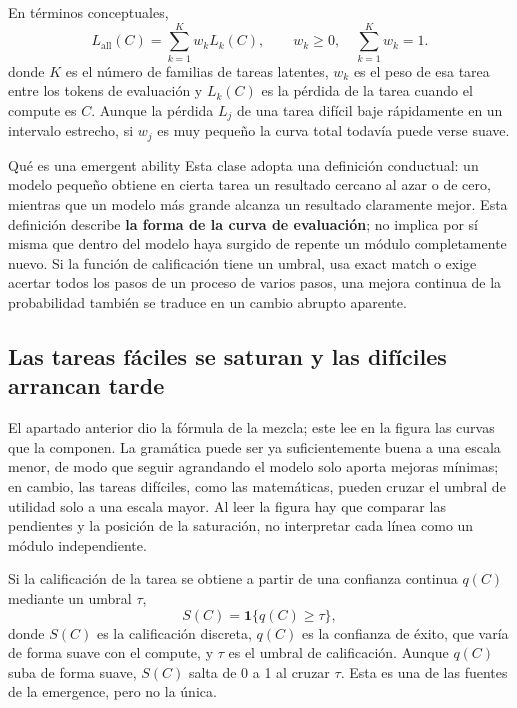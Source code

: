En términos conceptuales,
\[
L_{\mathrm{all}}(C)=\sum_{k=1}^{K} w_k L_k(C),
\qquad w_k\ge 0,\quad \sum_{k=1}^{K}w_k=1.
\]
donde $K$ es el número de familias de tareas latentes, $w_k$ es el peso de esa tarea entre los tokens de evaluación y $L_k(C)$ es la pérdida de la tarea cuando el compute es $C$. Aunque la pérdida $L_j$ de una tarea difícil baje rápidamente en un intervalo estrecho, si $w_j$ es muy pequeño la curva total todavía puede verse suave.

\begin{knowledgebox}{Qué es una emergent ability}
Esta clase adopta una definición conductual: un modelo pequeño obtiene en cierta tarea un resultado cercano al azar o de cero, mientras que un modelo más grande alcanza un resultado claramente mejor. Esta definición describe \textbf{la forma de la curva de evaluación}; no implica por sí misma que dentro del modelo haya surgido de repente un módulo completamente nuevo. Si la función de calificación tiene un umbral, usa exact match o exige acertar todos los pasos de un proceso de varios pasos, una mejora continua de la probabilidad también se traduce en un cambio abrupto aparente.
\end{knowledgebox}

\subsection{Las tareas fáciles se saturan y las difíciles arrancan tarde}

El apartado anterior dio la fórmula de la mezcla; este lee en la figura las curvas que la componen. La gramática puede ser ya suficientemente buena a una escala menor, de modo que seguir agrandando el modelo solo aporta mejoras mínimas; en cambio, las tareas difíciles, como las matemáticas, pueden cruzar el umbral de utilidad solo a una escala mayor. Al leer la figura hay que comparar las pendientes y la posición de la saturación, no interpretar cada línea como un módulo independiente.


Si la calificación de la tarea se obtiene a partir de una confianza continua $q(C)$ mediante un umbral $\tau$,
\[
S(C)=\mathbf{1}\{q(C)\ge \tau\},
\]
donde $S(C)$ es la calificación discreta, $q(C)$ es la confianza de éxito, que varía de forma suave con el compute, y $\tau$ es el umbral de calificación. Aunque $q(C)$ suba de forma suave, $S(C)$ salta de 0 a 1 al cruzar $\tau$. Esta es una de las fuentes de la emergence, pero no la única.

